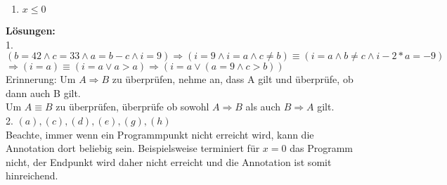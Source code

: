 \documentclass[hidelinks]{article}
\theoremstyle{plain}
\theoremstyle{definition}
\theoremstyle{rem}
\begin{document}
\begin{sloppypar}
\begin{enumerate}
\begin{enumerate}
	\item $x\le0$
\end{enumerate}
\end{enumerate}
\newpage
\textbf{Lösungen:}\\
1. $(b=42 \wedge c=33 \wedge a=b-c \wedge i=9)\Rightarrow(i=9\wedge i=a \wedge c\neq b)\equiv(i=a \wedge b\neq c\wedge i-2*a=-9)$\\
$\Rightarrow(i=a)\equiv(i=a \vee a>a)\Rightarrow(i=a \vee (a=9 \wedge c>b))$\\
Erinnerung: Um $A\Rightarrow B$ zu überprüfen, nehme an, dass A gilt und überprüfe, ob dann auch B gilt.\\
Um $A\equiv B$ zu überprüfen, überprüfe ob sowohl $A\Rightarrow B$ als auch $B\Rightarrow A$ gilt.\\

2. $(a),(c),(d),(e),(g),(h)$\\
Beachte, immer wenn ein Programmpunkt nicht erreicht wird, kann die Annotation dort beliebig sein. Beispielsweise terminiert für $x=0$ das Programm nicht, der Endpunkt wird daher nicht erreicht und die Annotation ist somit hinreichend.
\end{sloppypar}
\end{document}
